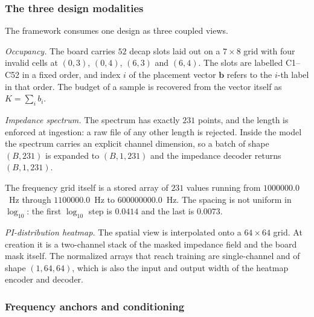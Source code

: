
\subsubsection*{The three design modalities}

The framework consumes one design as three coupled views.

\emph{Occupancy.} The board carries $52$ decap slots laid out on a $7 \times 8$
grid with four invalid cells at $(0,3)$, $(0,4)$, $(6,3)$ and $(6,4)$. The slots
are labelled C1--C52 in a fixed order, and index $i$ of the placement vector
$\mathbf{b}$ refers to the $i$-th label in that order. The budget of a sample is
recovered from the vector itself as $K = \sum_i b_i$.

\emph{Impedance spectrum.} The spectrum has exactly $231$ points, and the length
is enforced at ingestion: a raw file of any other length is rejected. Inside the
model the spectrum carries an explicit channel dimension, so a batch of shape
$(B,231)$ is expanded to $(B,1,231)$ and the impedance decoder returns
$(B,1,231)$.

The frequency grid itself is a stored array of $231$ values running from
$1000000.0$~Hz through $1100000.0$~Hz to $600000000.0$~Hz. The spacing is not
uniform in $\log_{10}$: the first $\log_{10}$ step is $0.0414$ and the last is
$0.0073$.

\emph{PI-distribution heatmap.} The spatial view is interpolated onto a
$64 \times 64$ grid. At creation it is a two-channel stack of the masked
impedance field and the board mask itself. The normalized arrays that reach
training are single-channel and of shape $(1,64,64)$, which is also the input and
output width of the heatmap encoder and decoder.


\subsubsection*{Frequency anchors and conditioning}

